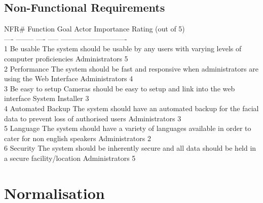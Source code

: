 \documentclass[
  english,
  a4paper,
,tablecaptionabove
]{scrartcl}
\begin{document}
\newpage

\hypertarget{non-functional-requirements}{%
\subsection{Non-Functional
Requirements}\label{non-functional-requirements}}

NFR\# \textbar{} Function \textbar{} Goal \textbar{} Actor \textbar{}
Importance Rating (out of 5) \textbar{}\\
---- \textbar{} -------- \textbar{} ---- \textbar{} ----- \textbar{}
---------------------------- \textbar\textbar{}\\
1 \textbar{} Be usable \textbar{} The system should be usable by any
users with varying levels of computer proficiencies \textbar{}
Administrators \textbar{} 5 \textbar{}\\
2 \textbar{} Performance \textbar{} The system should be fast and
responsive when administrators are using the Web Interface \textbar{}
Administrators \textbar{} 4 \textbar{}\\
3 \textbar{} Be easy to setup \textbar{} Cameras should be easy to setup
and link into the web interface \textbar{} System Installer \textbar{} 3
\textbar{}\\
4 \textbar{} Automated Backup \textbar{} The system should have an
automated backup for the facial data to prevent loss of authorised users
\textbar{} Administrators \textbar{} 3 \textbar{}\\
5 \textbar{} Language \textbar{} The system should have a variety of
languages available in order to cater for non english speakers
\textbar{} Administrators \textbar{} 2 \textbar{}\\
6 \textbar{} Security \textbar{} The system should be inherently secure
and all data should be held in a secure facility/location \textbar{}
Administrators \textbar{} 5 \textbar{}

\newpage

\hypertarget{normalisation}{%
\section{Normalisation}\label{normalisation}}
\end{document}
